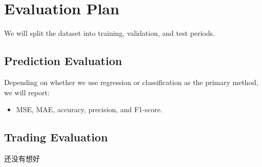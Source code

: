 \documentclass[12pt, a4paper]{article}
\begin{document}
\section{Evaluation Plan}
We will split the dataset into training, validation, and test periods.

\subsection{Prediction Evaluation}
Depending on whether we use regression or classification as the primary method, we will report:
\begin{itemize}
    \item MSE, MAE, accuracy, precision, and F1-score.
\end{itemize}

\subsection{Trading Evaluation}
还没有想好
\end{document}

